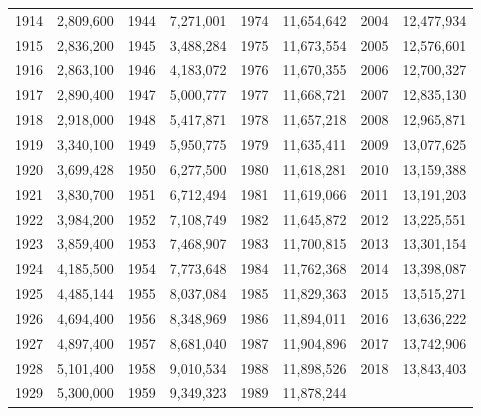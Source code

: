 \documentclass[12pt]{jarticle}
\begin{document}
\begin{table}
\begin{center}
\begin{tabular}[t]{|c|c||c|c||c|c||c|c|}
            1914 & 2,809,600 & 1944 & 7,271,001 & 1974 & 11,654,642 & 2004 & 12,477,934 \\
            1915 & 2,836,200 & 1945 & 3,488,284 & 1975 & 11,673,554 & 2005 & 12,576,601 \\
            1916 & 2,863,100 & 1946 & 4,183,072 & 1976 & 11,670,355 & 2006 & 12,700,327 \\
            1917 & 2,890,400 & 1947 & 5,000,777 & 1977 & 11,668,721 & 2007 & 12,835,130 \\
            1918 & 2,918,000 & 1948 & 5,417,871 & 1978 & 11,657,218 & 2008 & 12,965,871 \\
            1919 & 3,340,100 & 1949 & 5,950,775 & 1979 & 11,635,411 & 2009 & 13,077,625 \\
            1920 & 3,699,428 & 1950 & 6,277,500 & 1980 & 11,618,281 & 2010 & 13,159,388 \\
            1921 & 3,830,700 & 1951 & 6,712,494 & 1981 & 11,619,066 & 2011 & 13,191,203 \\
            1922 & 3,984,200 & 1952 & 7,108,749 & 1982 & 11,645,872 & 2012 & 13,225,551 \\
            1923 & 3,859,400 & 1953 & 7,468,907 & 1983 & 11,700,815 & 2013 & 13,301,154 \\
            1924 & 4,185,500 & 1954 & 7,773,648 & 1984 & 11,762,368 & 2014 & 13,398,087 \\
            1925 & 4,485,144 & 1955 & 8,037,084 & 1985 & 11,829,363 & 2015 & 13,515,271 \\
            1926 & 4,694,400 & 1956 & 8,348,969 & 1986 & 11,894,011 & 2016 & 13,636,222 \\
            1927 & 4,897,400 & 1957 & 8,681,040 & 1987 & 11,904,896 & 2017 & 13,742,906 \\
            1928 & 5,101,400 & 1958 & 9,010,534 & 1988 & 11,898,526 & 2018 & 13,843,403 \\
            1929 & 5,300,000 & 1959 & 9,349,323 & 1989 & 11,878,244 &      &            \\
            \hline
        \end{tabular}
    \end{center}
\end{table}
\clearpage
\end{document}

